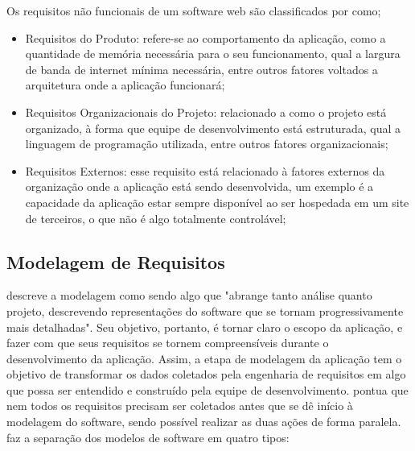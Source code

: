 Os requisitos não funcionais de um software web são classificados por \cite{casteleyn2009engineering} como;

\begin{itemize}
    \item Requisitos do Produto: refere-se ao comportamento da aplicação, como a quantidade de memória necessária para o seu funcionamento, qual a largura de banda de internet mínima necessária, entre outros fatores voltados a arquitetura onde a aplicação funcionará;
    \item Requisitos Organizacionais do Projeto: relacionado a como o projeto está organizado, à forma que equipe de desenvolvimento está estruturada, qual a linguagem de programação utilizada, entre outros fatores organizacionais;
    \item Requisitos Externos: esse requisito está relacionado à fatores externos da organização onde a aplicação está sendo desenvolvida, um exemplo é a capacidade da aplicação estar sempre disponível ao ser hospedada em um site de terceiros, o que não é algo totalmente controlável;
\end{itemize}

\subsection{Modelagem de Requisitos}

\cite{pressman2009engenharia} descreve a modelagem como sendo algo que "abrange tanto análise quanto projeto, descrevendo representações do software que se tornam progressivamente mais detalhadas". Seu objetivo, portanto, é tornar claro o escopo da aplicação, e fazer com que seus requisitos se tornem compreensíveis durante o desenvolvimento da aplicação. Assim, a etapa de modelagem da aplicação tem o objetivo de transformar os dados coletados pela engenharia de requisitos em algo que possa ser entendido e construído pela equipe de desenvolvimento. \cite{casteleyn2009engineering} pontua que nem todos os requisitos precisam ser coletados antes que se dê início à modelagem do software, sendo possível realizar as duas ações de forma paralela.
\cite{pressman2009engenharia}  faz a separação dos modelos de software em quatro tipos:

